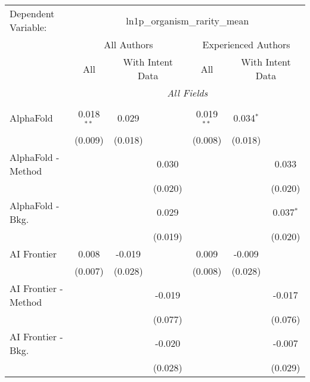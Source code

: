 \begingroup
\centering
\begin{tabular}{lcccccc}
   \tabularnewline \midrule \midrule
   Dependent Variable: & \multicolumn{6}{c}{ln1p\_organism\_rarity\_mean}\\
 & \multicolumn{3}{c}{All Authors} & \multicolumn{3}{c}{Experienced Authors} \\
\cmidrule(lr){2-4} \cmidrule(lr){5-7}
 & \multicolumn{1}{c}{All} & \multicolumn{2}{c}{With Intent Data} & \multicolumn{1}{c}{All} & \multicolumn{2}{c}{With Intent Data} \\
\cmidrule(lr){2-2} \cmidrule(lr){3-4} \cmidrule(lr){5-5} \cmidrule(lr){6-7}
 & \multicolumn{6}{c}{\textit{All Fields}} \\ \\
   AlphaFold            & 0.018$^{**}$  & 0.029       &               & 0.019$^{**}$  & 0.034$^{*}$ &   \\   
                        & (0.009)       & (0.018)     &               & (0.008)       & (0.018)     &   \\   
   AlphaFold - Method   &               &             & 0.030         &               &             & 0.033\\   
                        &               &             & (0.020)       &               &             & (0.020)\\   
   AlphaFold - Bkg.     &               &             & 0.029         &               &             & 0.037$^{*}$\\   
                        &               &             & (0.019)       &               &             & (0.020)\\   
   AI Frontier          & 0.008         & -0.019      &               & 0.009         & -0.009      &   \\   
                        & (0.007)       & (0.028)     &               & (0.008)       & (0.028)     &   \\   
   AI Frontier - Method &               &             & -0.019        &               &             & -0.017\\   
                        &               &             & (0.077)       &               &             & (0.076)\\   
   AI Frontier - Bkg.   &               &             & -0.020        &               &             & -0.007\\   
                        &               &             & (0.028)       &               &             & (0.029)\\   

\end{tabular}
